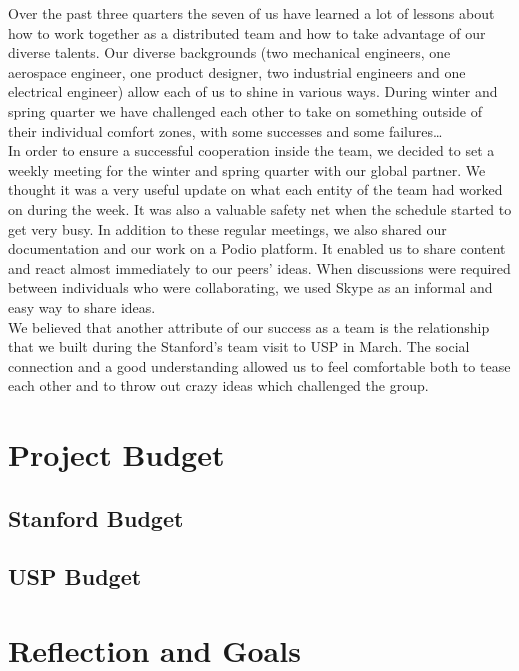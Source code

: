 Over the past three quarters the seven of us have learned a lot of lessons about how to work together as a distributed team and how to take advantage of our diverse talents. Our diverse backgrounds (two mechanical engineers, one aerospace engineer, one product designer, two industrial engineers and one electrical engineer) allow each of us to shine in various ways. During winter and spring quarter we have challenged each other to take on something outside of their individual comfort zones, with some successes and some failures…\\

In order to ensure a successful cooperation inside the team, we decided to set a weekly meeting for the winter and spring quarter with our global partner. We thought it was a very useful update on what each entity of the team had worked on during the week. It was also a valuable safety net when the schedule started to get very busy. In addition to these regular meetings, we also shared our documentation and our work on a Podio platform. It enabled us to share content and react almost immediately to our peers’ ideas. When discussions were required between individuals who were collaborating, we used Skype as an informal and easy way to share ideas.\\

We believed that another attribute of our success as a team is the relationship that we built during the Stanford’s team visit to USP in March. The social connection and a good understanding allowed us to feel comfortable both to tease each other and to throw out crazy ideas which challenged the group.


\section{Project Budget}

\subsection{Stanford Budget}

\subsection{USP Budget}
 
\section{Reflection and Goals}

